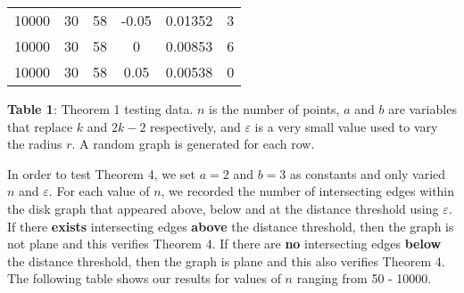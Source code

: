 \documentclass{article}
\begin{document}
\begin{center}
\begin{longtable}{ | c | c | c | c | c | L | }
10000 & 30 & 58 & -0.05 & 0.01352 & 3 \\
10000 & 30 & 58 & 0 & 0.00853 & 6 \\
10000 & 30 & 58 & 0.05 & 0.00538 & 0 \\

\hline
\end{longtable}
\begin{small}
\textbf{Table 1}: Theorem 1 testing data. $n$ is the number of points, $a$ and $b$ are variables that replace $k$ and $2k-2$ respectively, and $\varepsilon$ is a very small value used to vary the radius $r$. A random graph is generated for each row.
\end{small}
\end{center}

\newpage
In order to test Theorem 4, we set $a=2$ and $b=3$ as constants and only varied $n$ and $\varepsilon$. For each value of $n$, we recorded the number of intersecting edges within the disk graph that appeared above, below and at the distance threshold using $\varepsilon$. If there \textbf{exists} intersecting edges \textbf{above} the distance threshold, then the graph is not plane and this verifies Theorem 4. If there are \textbf{no} intersecting edges \textbf{below} the distance threshold, then the graph is plane and this also verifies Theorem 4. The following table shows our results for values of $n$ ranging from 50 - 10000.
\end{document}
